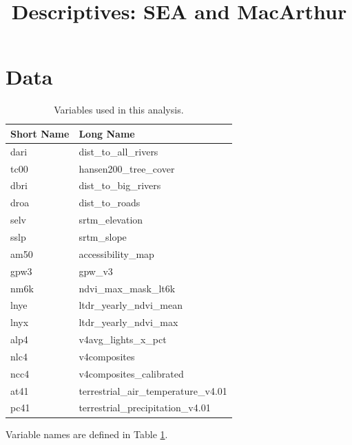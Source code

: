 \documentclass{article}\usepackage[]{graphicx}\usepackage[]{color}
\title{Descriptives: SEA and MacArthur}
\newenvironment{knitrout}{}{}  %
\begin{document}
\begin{knitrout}

\maketitle
\tableofcontents











\newpage
\section{Data}
\begin{table}[ht]
\centering
\begingroup\footnotesize
\begin{tabular}{ll}
  \hline
Short Name & Long Name \\ 
  \hline
dari & dist\_to\_all\_rivers \\ 
  tc00 & hansen200\_tree\_cover \\ 
  dbri & dist\_to\_big\_rivers \\ 
  droa & dist\_to\_roads \\ 
  selv & srtm\_elevation \\ 
  sslp & srtm\_slope \\ 
  am50 & accessibility\_map \\ 
  gpw3 & gpw\_v3 \\ 
  nm6k & ndvi\_max\_mask\_lt6k \\ 
  lnye & ltdr\_yearly\_ndvi\_mean \\ 
  lnyx & ltdr\_yearly\_ndvi\_max \\ 
  alp4 & v4avg\_lights\_x\_pct \\ 
  nlc4 & v4composites \\ 
  ncc4 & v4composites\_calibrated \\ 
  at41 & terrestrial\_air\_temperature\_v4.01 \\ 
  pc41 & terrestrial\_precipitation\_v4.01 \\ 
   \hline
\end{tabular}
\endgroup
\caption{Variables used in this analysis.} 
\label{Variable_Table}
\end{table}

Variable names are defined in Table \ref{Variable_Table}.  

\newpage


\end{knitrout}
\end{document}
